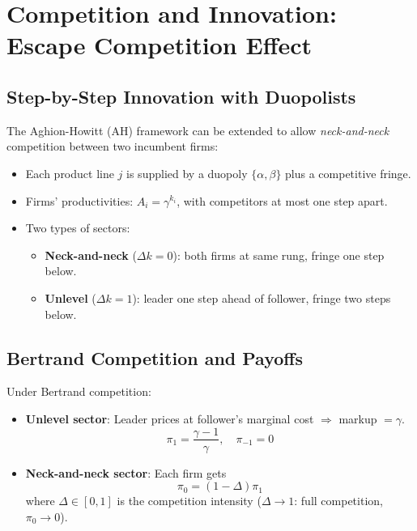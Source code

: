 \documentclass[a4paper,11pt]{article}
\begin{document}
\clearpage

\section{Competition and Innovation: Escape Competition Effect}

\subsection*{Step-by-Step Innovation with Duopolists}

The Aghion-Howitt (AH) framework can be extended to allow \emph{neck-and-neck} competition between two incumbent firms:

\begin{itemize}
    \item Each product line $j$ is supplied by a duopoly $\{\alpha, \beta\}$ plus a competitive fringe.
    \item Firms' productivities: $A_i = \gamma^{k_i}$, with competitors at most one step apart.
    \item Two types of sectors:
    \begin{itemize}
        \item \textbf{Neck-and-neck} ($\Delta k = 0$): both firms at same rung, fringe one step below.
        \item \textbf{Unlevel} ($\Delta k = 1$): leader one step ahead of follower, fringe two steps below.
    \end{itemize}
\end{itemize}

\subsection*{Bertrand Competition and Payoffs}

Under Bertrand competition:
\begin{itemize}
    \item \textbf{Unlevel sector}: Leader prices at follower's marginal cost $\Rightarrow$ markup $= \gamma$.
    \[
    \pi_1 = \frac{\gamma - 1}{\gamma}, \quad \pi_{-1} = 0
    \]
    \item \textbf{Neck-and-neck sector}: Each firm gets
    \[
    \pi_0 = (1-\Delta)\pi_1
    \]
    where $\Delta \in [0,1]$ is the competition intensity ($\Delta \to 1$: full competition, $\pi_0 \to 0$).
\end{itemize}
\end{document}
